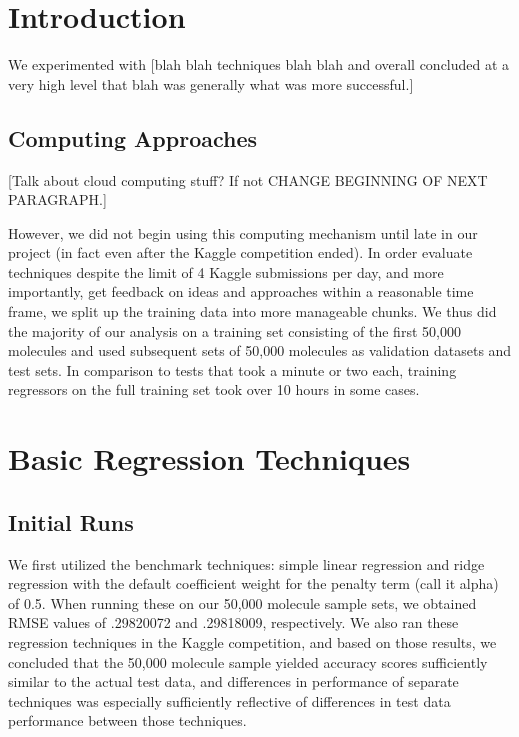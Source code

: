 \documentclass{article}
\begin{document}
\maketitle

\section{Introduction}

We experimented with [blah blah techniques blah blah and overall concluded at a very high level that blah was generally what was more successful.]

\subsection{Computing Approaches}

[Talk about cloud computing stuff? If not CHANGE BEGINNING OF NEXT PARAGRAPH.]

However, we did not begin using this computing mechanism until late in our project (in fact even after the Kaggle competition ended). In order evaluate techniques despite the limit of 4 Kaggle submissions per day, and more importantly, get feedback on ideas and approaches within a reasonable time frame,  we split up the training data into more manageable chunks. We thus did the majority of our analysis on a training set consisting of the first 50,000 molecules and used subsequent sets of 50,000 molecules as validation datasets and test sets. In comparison to tests that took a minute or two each, training regressors on the full training set took over 10 hours in some cases.

\section{Basic Regression Techniques}

\subsection{Initial Runs}

We first utilized the benchmark techniques: simple linear regression and ridge regression with the default coefficient weight for the penalty term (call it alpha) of 0.5. When running these on our 50,000 molecule sample sets, we obtained RMSE values of .29820072 and .29818009, respectively. We also ran these regression techniques in the Kaggle competition, and based on those results, we concluded that the 50,000 molecule sample yielded accuracy scores sufficiently similar to the actual test data, and differences in performance of separate techniques was especially sufficiently reflective of differences in test data performance between those techniques.
\end{document}
